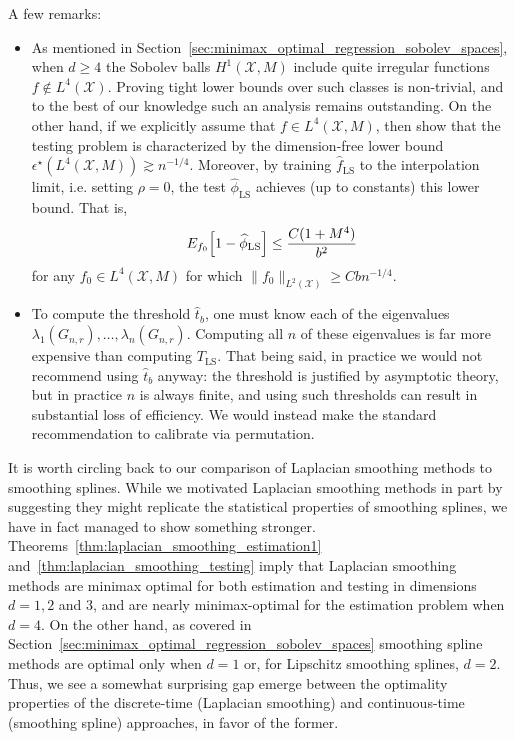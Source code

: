 \documentclass{article}
\newcommand{\1}{\mathbf{1}}
\newcommand{\Xset}{\mathcal{X}}
\newcommand{\Leb}{L}
\newcommand{\wh}[1]{\widehat{#1}}
\newcommand{\LS}{\mathrm{LS}}
\theoremstyle{alden}
\theoremstyle{aldenthm}
\theoremstyle{definition}
\theoremstyle{remark}
\begin{document}
A few remarks:
\begin{itemize}
	\item As mentioned in Section~\ref{sec:minimax_optimal_regression_sobolev_spaces}, when $d \geq 4$ the Sobolev balls $H^1(\Xset,M)$ include quite irregular functions $f \not\in \Leb^4(\Xset)$. Proving tight lower bounds over such classes is non-trivial, and to the best of our knowledge such an analysis remains outstanding. On the other hand, if we explicitly assume that $f \in \Leb^4(\Xset,M)$, then \cite{guerre02} show that the testing problem is characterized by the dimension-free lower bound $\epsilon^{\star}(\Leb^4(\Xset,M)) \gtrsim n^{-1/4}$. Moreover, by training $\wh{f}_{\LS}$ to the interpolation limit, i.e. setting $\rho = 0$, the test $\wh{\phi}_{\LS}$ achieves (up to constants) this lower bound. That is, 
	\begin{equation}
	\label{eqn:laplacian_smoothing_testing_low_smoothness}
	E_{f_0}\Bigl[1 - \wh{\phi}_{\LS}\Bigr] \leq \frac{C(1 + M^4)}{b^2}
	\end{equation}
	for any $f_0 \in \Leb^4(\Xset,M)$ for which $\|f_0\|_{\Leb^2(\Xset)} \geq C bn^{-1/4}$. 
	\item To compute the threshold $\wh{t}_b$, one must know each of the eigenvalues $\lambda_1(G_{n,r}),\ldots,\lambda_n(G_{n,r})$. Computing all $n$ of these eigenvalues is far more expensive than computing $T_{\LS}$. That being said, in practice we would not recommend using $\wh{t}_b$ anyway: the threshold is justified by asymptotic theory, but in practice $n$ is always finite, and using such thresholds can result in substantial loss of efficiency. We would instead make the standard recommendation to calibrate via permutation. 
\end{itemize}
It is worth circling back to our comparison of Laplacian smoothing methods to smoothing splines. While we motivated Laplacian smoothing methods in part by suggesting they might replicate the statistical properties of smoothing splines, we have in fact managed to show something stronger. Theorems~\ref{thm:laplacian_smoothing_estimation1} and~\ref{thm:laplacian_smoothing_testing} imply that Laplacian smoothing methods are minimax optimal for both estimation and testing in dimensions $d = 1,2$ and $3$, and are nearly minimax-optimal for the estimation problem when $d = 4$. On the other hand, as covered in Section~\ref{sec:minimax_optimal_regression_sobolev_spaces} smoothing spline methods are optimal only when $d = 1$ or, for Lipschitz smoothing splines, $d = 2$. Thus, we see a somewhat surprising gap emerge between the optimality properties of the discrete-time (Laplacian smoothing) and continuous-time (smoothing spline) approaches, in favor of the former.
\end{document}
